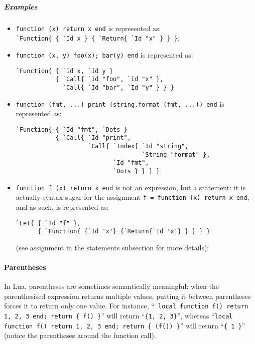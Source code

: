 \subparagraph{Examples}
\begin{itemize}

\item \verb+function (x) return x end+ is represented as:\\
  \verb+`Function{ { `Id x } { `Return{ `Id "x" } } }+;

\item \verb+function (x, y) foo(x); bar(y) end+ is represented as:
\begin{verbatim}
`Function{ { `Id x, `Id y }
           { `Call{ `Id "foo", `Id "x" },
             `Call{ `Id "bar", `Id "y" } } }
\end{verbatim}

\item \verb+function (fmt, ...) print (string.format (fmt, ...)) end+
  is represented as:
\begin{verbatim}
`Function{ { `Id "fmt", `Dots }
           { `Call{ `Id "print",
                    `Call{ `Index{ `Id "string",
                                   `String "format" },
                           `Id "fmt",
                           `Dots } } } }
\end{verbatim}

\item \verb+function f (x) return x end+ is not an expression, but a
  statement: it is actually syntax sugar for the assignment {\tt f =
    function (x) return x end}, and as such, is represented as:
\begin{verbatim}
`Let{ { `Id "f" },
      { `Function{ {`Id 'x'} {`Return{`Id 'x'} } } } }
\end{verbatim}
  (see assignment in the statements subsection for more details);

\end{itemize}

\paragraph{Parentheses}

In Lua, parentheses are sometimes semantically meaningful: when the
parenthesised expression returns multiple values, putting it between
parentheses forces it to return only one value. For instance, ``{\tt
  local function f() return 1, 2, 3 end; return \{ f() \}}'' will
return ``{\tt\{1, 2, 3\}}'', whereas ``{\tt local function f() return
  1, 2, 3 end; return \{ (f()) \}}'' will return ``{\tt\{ 1 \}}''
(notice the parentheses around the function call).

